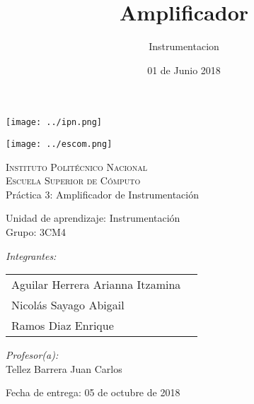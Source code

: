 \documentclass[12pt]{article}
\date{ 01 de Junio 2018}
\title{Amplificador}
\author{Instrumentacion}
\begin{document}
		\begin{titlepage}
			\begin{center}
				
				
				\noindent
				\begin{minipage}{0.5\textwidth}
					\begin{flushleft} \large
						\texttt{[image: ../ipn.png]}
					\end{flushleft}
				\end{minipage}%
				\begin{minipage}{0.55\textwidth}
					\begin{flushright} \large
						\texttt{[image: ../escom.png]}
					\end{flushright}
				\end{minipage}
				
				\textsc{\LARGE Instituto Politécnico Nacional}\\[0.5cm]
				
				\textsc{\Large Escuela Superior de Cómputo}\\[1cm]
				
				
				{ \huge Práctica 3: Amplificador de Instrumentación \\[1cm] }
				
				{ \Large Unidad de aprendizaje: Instrumentación} \\[1cm]
				
				{ \Large Grupo: 3CM4 } \\[1cm]
				
				\noindent
				\begin{minipage}{0.5\textwidth}
					\begin{flushleft} \large
						\emph{Integrantes:}\\
						
						\begin{tabular}{ll}
						Aguilar Herrera Arianna Itzamina \\
					    Nicolás Sayago Abigail\\
					    Ramos Diaz Enrique \\
					\end{tabular}
					\end{flushleft}
				\end{minipage}%
				\begin{minipage}{0.5\textwidth}
					\begin{flushright} \large
						\emph{Profesor(a):} \\
						Tellez Barrera Juan Carlos  \\
					\end{flushright}
				\end{minipage}
				
				\vfill
				
				{\large Fecha de entrega: 05 de octubre de 2018}
			\end{center}
		\end{titlepage}
	
\end{document}
